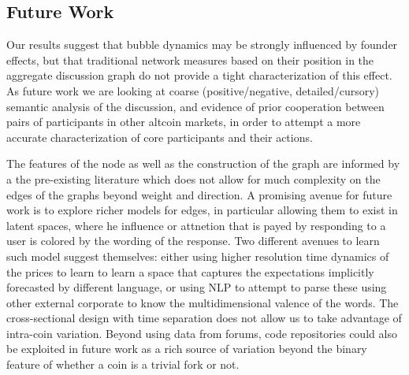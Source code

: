 \subsection{Future Work}

Our results suggest that bubble dynamics may be strongly influenced by founder effects, but that traditional network measures based on their position in the aggregate discussion graph do not provide a tight characterization of this effect.
As future work we are looking at coarse (positive/negative, detailed/cursory) semantic analysis of the discussion, and evidence of prior cooperation between pairs of participants in other altcoin markets, in order to attempt a more accurate characterization of core participants and their actions.

The features of the node as well as the construction of the graph are informed by a the pre-existing literature which does not allow for much complexity on the edges of the graphs beyond weight and direction.
A promising avenue for future work is to explore richer models for edges, in particular allowing them to exist in latent spaces, where he influence or attnetion that is payed by responding to a user is colored by the wording of the response. 
Two different avenues to learn such model suggest themselves: either using higher resolution time dynamics of the prices to learn to learn a space that captures the expectations implicitly forecasted by different language, or using NLP to attempt to parse these using other external corporate to know the multidimensional valence of the words.
The cross-sectional design with time separation does not allow us to take advantage of intra-coin variation.
Beyond using data from forums, code repositories could also be exploited in future work as a rich source of variation beyond the binary feature of whether a coin is a trivial fork or not.
